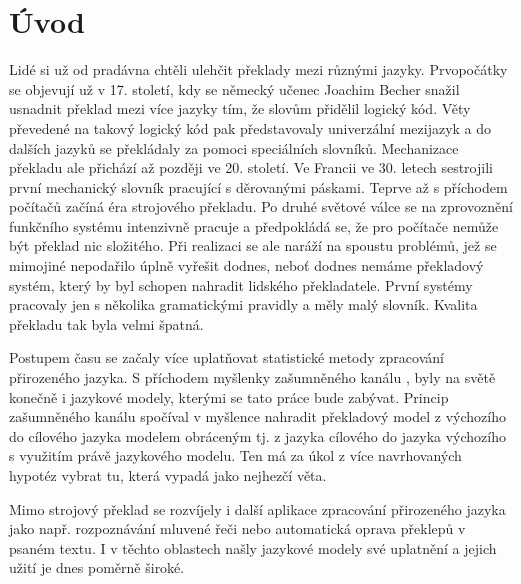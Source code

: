 \documentclass[12pt,a4paper]{report}
\let\openright=\clearpage
\def\chapwithtoc#1{
\chapter*{#1}
\addcontentsline{toc}{chapter}{#1}
}
\begin{document}
\newpage


\openright
\pagestyle{plain}
\tableofcontents

%
%
%


\captionsetup[figure]{aboveskip=0pt, parskip=0pt}


\chapwithtoc{Úvod}
Lidé si už od pradávna chtěli ulehčit překlady mezi různými jazyky. Prvopočátky se objevují už v 17. století, kdy se německý učenec Joachim Becher snažil usnadnit překlad mezi více jazyky tím, že slovům přidělil logický kód. Věty převedené na takový logický kód pak představovaly univerzální mezijazyk a do dalších jazyků se překládaly za pomoci speciálních slovníků. Mechanizace překladu ale přichází až později ve 20. století. Ve Francii ve 30. letech sestrojili první mechanický slovník pracující s děrovanými páskami. Teprve až s příchodem počítačů začíná éra strojového překladu. Po druhé světové válce se na zprovoznění funkčního systému intenzivně pracuje a předpokládá se, že pro počítače nemůže být překlad nic složitého. Při realizaci se ale naráží na spoustu problémů, jež se mimojiné nepodařilo úplně vyřešit dodnes, neboť dodnes nemáme překladový systém, který by byl schopen nahradit lidského překladatele. První systémy pracovaly jen s několika gramatickými pravidly a měly malý slovník. Kvalita překladu tak byla velmi špatná.

Postupem času se začaly více uplatňovat statistické metody zpracování přirozeného jazyka. S příchodem myšlenky zašumněného kanálu \cite{jurafsky08}, byly na světě konečně i jazykové modely, kterými se tato práce bude zabývat. Princip zašumněného kanálu spočíval v myšlence nahradit překladový model z výchozího do cílového jazyka modelem obráceným tj. z jazyka cílového do jazyka výchozího s využitím právě jazykového modelu. Ten má za úkol z více navrhovaných hypotéz vybrat tu, která vypadá jako nejhezčí věta.

Mimo strojový překlad se rozvíjely i další aplikace zpracování přirozeného jazyka jako např. rozpoznávání mluvené řeči nebo automatická oprava překlepů v psaném textu. I v těchto oblastech našly jazykové modely své uplatnění a jejich užití je dnes poměrně široké.
\end{document}
